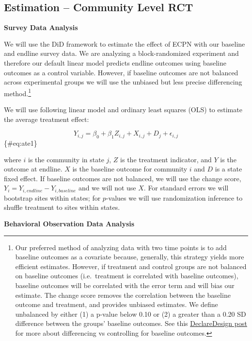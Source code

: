 \documentclass[
]{article}
\begin{document}
\hypertarget{estimation-community-level-rct}{%
\subsection{Estimation -- Community Level
RCT}\label{estimation-community-level-rct}}

\textbf{Survey Data Analysis}

We will use the DiD framework to estimate the effect of ECPN with our
baseline and endline survey data. We are analyzing a block-randomized
experiment and therefore our default linear model predicts endline
outcomes using baseline outcomes as a control variable. However, if
baseline outcomes are not balanced across experimental groups we will
use the unbiased but less precise differencing method.\footnote{Our
  preferred method of analyzing data with two time points is to add
  baseline outcomes as a covariate because, generally, this strategy
  yields more efficient estimates. However, if treatment and control
  groups are not balanced on baseline outcomes (i.e.~treatment is
  correlated with baseline outcomes), baseline outcomes will be
  correlated with the error term and will bias our estimate. The change
  score removes the correlation between the baseline outcome and
  treatment, and provides unbiased estimates. We define unbalanced by
  either (1) a p-value below 0.10 or (2) a greater than a 0.20 SD
  difference between the groups' baseline outcomes. See this
  \href{https://declaredesign.org/blog/use-change-scores-or-control-for-pre-treatment-outcomes-depends-on-the-true-data-generating-process.html}{DeclareDesign
  post} for more about differencing vs controlling for baseline
  outcomes.}

We will use following linear model and ordinary least squares (OLS) to
estimate the average treatment effect:

\[ Y_{i,j} = \beta_0 + \beta_1 Z_{i,j} + X_{i,j} + D_{j} + \epsilon_{i,j} \]\{\#eq:ate1\}

where \(i\) is the community in state \(j\), \(Z\) is the treatment
indicator, and \(Y\) is the outcome at endline. \(X\) is the baseline
outcome for community \(i\) and \(D\) is a state fixed effect. If
baseline outcomes are not balanced, we will use the change score,
\(Y_i = Y_{i,endline} - Y_{i,baseline}\) and we will not use \(X\). For
standard errors we will bootstrap sites within states; for \(p\)-values
we will use randomization inference to shuffle treatment to sites within
states.

\textbf{Behavioral Observation Data Analysis}
\end{document}
